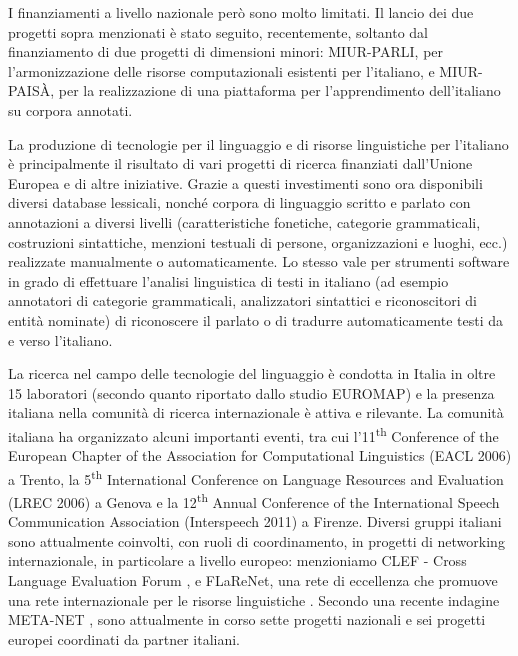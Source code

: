 \documentclass[]{../../metanetpaper}
\begin{document}
\begin{multicols}{2}
I finanziamenti a livello nazionale per\`{o} sono molto limitati. Il lancio dei due progetti sopra menzionati \`{e} stato seguito, recentemente, soltanto dal finanziamento di due progetti di dimensioni minori: MIUR-PARLI, per l'armonizzazione delle risorse computazionali esistenti per l'italiano, e MIUR-PAIS\`{A}, per la realizzazione di una piattaforma per l'apprendimento dell'italiano su corpora annotati.

La produzione di tecnologie per il linguaggio e di risorse linguistiche per l'italiano \`{e} principalmente il risultato di vari progetti di ricerca finanziati dall'Unione Europea e di altre iniziative. Grazie a questi investimenti sono ora disponibili diversi database lessicali, nonch\'{e} corpora di linguaggio scritto e parlato con annotazioni a diversi livelli (caratteristiche fonetiche, categorie grammaticali, costruzioni sintattiche, menzioni testuali di persone, organizzazioni e luoghi, ecc.) realizzate manualmente o automaticamente. Lo stesso vale per strumenti software in grado di effettuare l'analisi linguistica di testi in italiano (ad esempio annotatori di categorie grammaticali, analizzatori sintattici e riconoscitori di entit\`{a} nominate) di riconoscere il parlato o di tradurre automaticamente testi da e verso l'italiano.

La ricerca nel campo delle tecnologie del linguaggio \`{e} condotta in Italia in oltre 15 laboratori (secondo quanto riportato dallo studio EUROMAP) e la presenza italiana nella comunit\`{a} di ricerca internazionale \`{e} attiva e rilevante. La comunit\`{a} italiana ha organizzato alcuni importanti eventi, tra cui l'11\textsuperscript{th} Conference of the European Chapter of the Association for Computational Linguistics (EACL 2006) a Trento, la 5\textsuperscript{th} International Conference on Language Resources and Evaluation (LREC 2006) a Genova e la 12\textsuperscript{th} Annual Conference of the International Speech Communication Association (Interspeech 2011) a Firenze. Diversi gruppi italiani sono attualmente coinvolti, con ruoli di coordinamento, in progetti di networking internazionale, in particolare a livello europeo: menzioniamo CLEF - Cross Language Evaluation Forum \cite{clef}, e FLaReNet, una rete di eccellenza che promuove una rete internazionale per le risorse linguistiche \cite{flarenet}. Secondo una recente indagine META-NET \cite{soria}, sono attualmente in corso sette progetti nazionali e sei progetti europei coordinati da partner italiani.


\end{multicols}
\end{document}
